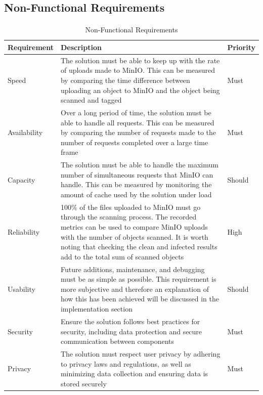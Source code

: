 \documentclass[12pt, conference, final, a4paper, onecolumn, compsoc]{IEEEtran}
\begin{document}


\subsection*{Non-Functional Requirements}
\paragraph{}

\begin{table}[H]
  \centering
  \begin{tabular}{|l|p{}|l|}
    \hline
    \textbf{Requirement} & \textbf{Description} & \textbf{Priority} \\ \hline
    Speed & The solution must be able to keep up with the rate of uploads made to MinIO. This can be measured by comparing the time difference between uploading an object to MinIO and the object being scanned and tagged & Must \\ \hline
    Availability & Over a long period of time, the solution must be able to handle all requests. This can be measured by comparing the number of requests made to the number of requests completed over a large time frame & Must \\ \hline
    Capacity & The solution must be able to handle the maximum number of simultaneous requests that MinIO can handle. This can be measured by monitoring the amount of cache used by the solution under load & Should \\ \hline
    Reliability & 100\% of the files uploaded to MinIO must go through the scanning process. The recorded metrics can be used to compare MinIO uploads with the number of objects scanned. It is worth noting that checking the clean and infected results add to the total sum of scanned objects & High \\ \hline
    Usability & Future additions, maintenance, and debugging must be as simple as possible. This requirement is more subjective and therefore an explanation of how this has been achieved will be discussed in the implementation section & Should \\ \hline
    Security & Ensure the solution follows best practices for security, including data protection and secure communication between components & Must \\ \hline
    Privacy & The solution must respect user privacy by adhering to privacy laws and regulations, as well as minimizing data collection and ensuring data is stored securely & Must \\ \hline
  \end{tabular}
  \caption{Non-Functional Requirements}
  \label{tab:non_functional_requirements}
\end{table}
\end{document}
